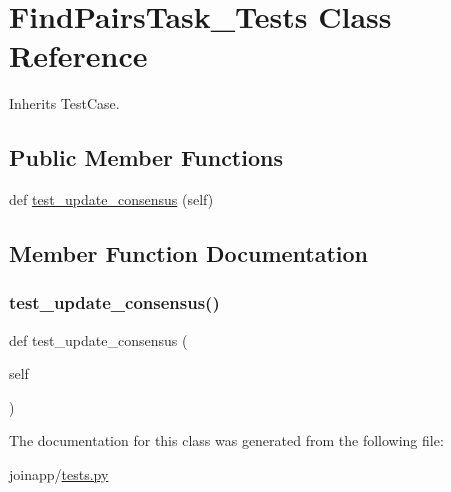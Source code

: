 \hypertarget{classjoinapp_1_1tests_1_1_find_pairs_task___tests}{}\section{Find\+Pairs\+Task\+\_\+\+Tests Class Reference}
\label{classjoinapp_1_1tests_1_1_find_pairs_task___tests}


Inherits Test\+Case.

\subsection*{Public Member Functions}
\begin{DoxyCompactItemize}
\item 
def \mbox{\hyperlink{classjoinapp_1_1tests_1_1_find_pairs_task___tests_a42549850130eb7841e5ca9614e2b4c5a}{test\+\_\+update\+\_\+consensus}} (self)
\end{DoxyCompactItemize}


\subsection{Member Function Documentation}
\mbox{\label{classjoinapp_1_1tests_1_1_find_pairs_task___tests_a42549850130eb7841e5ca9614e2b4c5a}} 
\subsubsection{\texorpdfstring{test\_update\_consensus()}{test\_update\_consensus()}}
{\footnotesize\ttfamily def test\+\_\+update\+\_\+consensus (\begin{DoxyParamCaption}\item[{}]{self }\end{DoxyParamCaption})}



The documentation for this class was generated from the following file\+:\begin{DoxyCompactItemize}
\item 
joinapp/\mbox{\hyperlink{tests_8py}{tests.\+py}}\end{DoxyCompactItemize}
